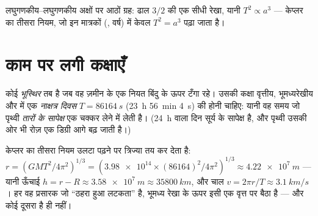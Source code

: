 \begin{omfigure}

{\small लघुगणकीय--लघुगणकीय अक्षों पर आठों ग्रह: ढाल $3/2$ की एक सीधी रेखा,
यानी $T^2 \propto a^3$ --- केप्लर का तीसरा नियम, जो इन मात्रकों (, वर्ष) में केवल $T^2 = a^3$ पढ़ा जाता है।}
\end{omfigure}

\section{काम पर लगी कक्षाएँ}

\begin{definition}[भूस्थिर कक्षा]\label{def:g12:satellites-kepler:geo}
कोई  \emph{भूस्थिर} तब है जब वह ज़मीन के
एक नियत बिंदु के ऊपर टँगा रहे। उसकी कक्षा वृत्तीय, भूमध्यरेखीय और
 में एक \emph{नाक्षत्र दिवस} $T = \qty{86164}{s}$
(\qty{23}{h} \qty{56}{min} \qty{4}{s}) की होनी चाहिए: यानी वह समय जो पृथ्वी \emph{तारों के
सापेक्ष} एक चक्कर लेने में लेती है। (\qty{24}{h} वाला दिन सूर्य के सापेक्ष है, और
पृथ्वी उसकी ओर भी रोज़ एक डिग्री आगे बढ़ जाती है।)
\end{definition}

\begin{example}[भूस्थिर ऊँचाई]\label{ex:g12:satellites-kepler:geoalt}
केप्लर का तीसरा नियम उलटा पढ़ने पर त्रिज्या तय कर देता है: $r = \left(GMT^2/4\pi^2\right)^{1/3} =
\left(\num{3.98e14} \times (\num{86164})^2/4\pi^2\right)^{1/3}
\approx \qty{4.22e7}{m}$ --- यानी
ऊँचाई $h = r - R \approx
\qty{3.58e7}{m} \approx \qty{35800}{km}$, और चाल $v = 2\pi r/T
\approx \qty{3.1}{km/s}$। हर वह प्रसारक जो ``ठहरा हुआ लटकता'' है,
भूमध्य रेखा के ऊपर इसी एक वृत्त पर बैठा है --- और कोई दूसरा है ही नहीं।
\end{example}

